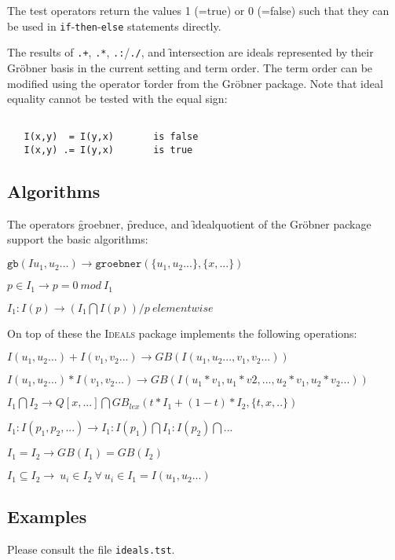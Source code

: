 The test operators return the values 1 (=true) or 0 (=false)
such that they can be used in \REDUCE \texttt{if}-\texttt{then}-\texttt{else} statements
directly.

The results of \texttt{.+}, \texttt{.*}, \texttt{.:}/\texttt{./}, and \f{intersection} are ideals
represented by their Gr\"obner basis in the current setting and
term order. The term order can be modified using the operator
\f{torder} from the Gr\"obner package. Note that ideal equality
cannot be tested with the \REDUCE equal sign:

\begin{verbatim}

   I(x,y)  = I(y,x)       is false
   I(x,y) .= I(y,x)       is true

\end{verbatim}

\subsection{Algorithms}

The operators \f{groebner}, \f{preduce}, and \f{idealquotient} of the
%
%
%
\REDUCE Gr\"obner package support the basic algorithms:

$\mathtt{gb}(Iu_1,u_2...) \rightarrow \mathtt{groebner}(\{u_1,u_2...\},\{x,...\})$

$p \in I_1 \rightarrow p=0 \ mod \ I_1$

$I_1 : I(p) \rightarrow (I_1 \bigcap I(p)) / p \ elementwise$

\noindent
On top of these the \textsc{Ideals} package implements the following
operations:


$I(u_1,u_2...)+I(v_1,v_2...) \rightarrow GB(I(u_1,u_2...,v_1,v_2...))$


$I(u_1,u_2...)*I(v_1,v_2...)\rightarrow
 GB(I(u_1*v_1,u_1*v2,...,u_2*v_1,u_2*v_2...))$


$I_1 \bigcap I_2 \rightarrow
  Q[x,...] \bigcap GB_{lex}(t*I_1 + (1-t)*I_2,\{t,x,..\}) $


$I_1 : I(p_1,p_2,...) \rightarrow I_1 : I(p_1) \bigcap I_1 : I(p_2)
\bigcap ...$

$I_1 = I_2 \rightarrow GB(I_1)=GB(I_2)$

$I_1 \subseteq I_2
   \rightarrow \ u_i \in I_2 \ \forall \ u_i \in I_1=I(u_1,u_2...)$

\subsection{Examples}

Please consult the file \texttt{ideals.tst}.
